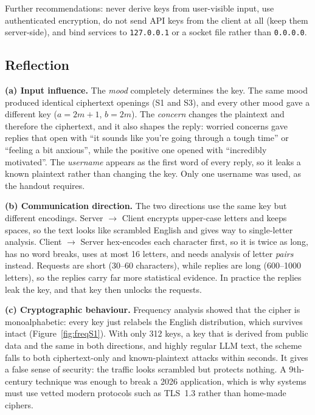 \documentclass[11pt,a4paper]{article}
\DeclareRobustCommand{\_}{\textunderscore\allowbreak}  %
\newcommand{\ct}[1]{\texttt{#1}}
\newcommand{\csdir}{Client $\rightarrow$ Server}
\newcommand{\scdir}{Server $\rightarrow$ Client}
\begin{document}
Further recommendations: never derive keys from user-visible input, use authenticated encryption, do not send API
keys from the client at all (keep them server-side), and bind services to \ct{127.0.0.1} or a socket file rather
than \ct{0.0.0.0}.

\subsection{Reflection}

\textbf{(a) Input influence.}
The \emph{mood} completely determines the key. The same mood produced identical ciphertext openings (S1 and S3), and
every other mood gave a different key ($a=2m+1$, $b=2m$). The \emph{concern} changes the plaintext and therefore the
ciphertext, and it also shapes the reply: worried concerns gave replies that open with ``it sounds like you're going
through a tough time'' or ``feeling a bit anxious'', while the positive one opened with ``incredibly motivated''. The
\emph{username} appears as the first word of every reply, so it leaks a known plaintext rather than changing the key.
Only one username was used, as the handout requires.

\textbf{(b) Communication direction.}
The two directions use the same key but different encodings. \scdir{} encrypts upper-case letters and keeps spaces, so
the text looks like scrambled English and gives way to single-letter analysis. \csdir{} hex-encodes each character first,
so it is twice as long, has no word breaks, uses at most 16 letters, and needs analysis of letter \emph{pairs}
instead. Requests are short (30--60 characters), while replies are long (600--1000 letters), so the replies carry far
more statistical evidence. In practice the replies leak the key, and that key then unlocks the requests.

\textbf{(c) Cryptographic behaviour.}
Frequency analysis showed that the cipher is monoalphabetic: every key just relabels the English distribution, which
survives intact (Figure~\ref{fig:freqS1}). With only 312 keys, a key that is derived from public data and the same in
both directions, and highly regular LLM text, the scheme falls to both ciphertext-only and known-plaintext attacks
within seconds. It gives a false sense of security: the traffic looks scrambled but protects nothing. A 9th-century
technique was enough to break a 2026 application, which is why systems must use vetted modern protocols such as
TLS~1.3 rather than home-made ciphers.
\end{document}
